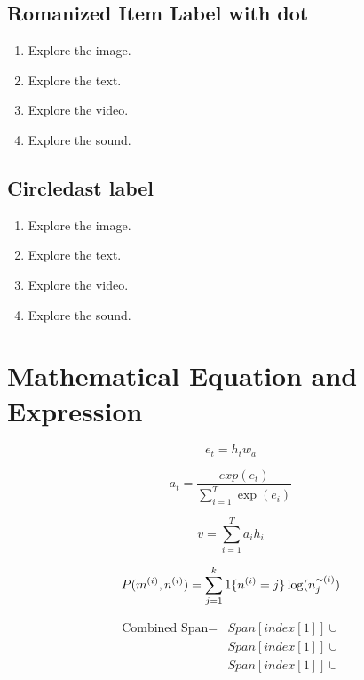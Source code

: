 \documentclass[11pt]{article}
\begin{document}
\subsection{Romanized Item Label with dot}
\begin{enumerate}[nosep, label=\Roman*.]
\item Explore the image.
\item Explore the text.
\item Explore the video.
\item Explore the sound.
\end{enumerate}

\subsection{Circledast label}
\begin{enumerate}[label=$\circledast$]
\item Explore the image.
\item Explore the text.
\item Explore the video.
\item Explore the sound.
\end{enumerate}

\section{Mathematical Equation and Expression}
\label{ref:equation}
\begin{equation}
e_{t} = h_{t}w_{a}
\label{eqn:sampleEqn} %
\end{equation}

\begin{equation*} %
a_{t} = \frac{exp(e_{t})}{\sum^T_{i=1}\exp(e_{i})}
\end{equation*}

\begin{equation*}
v = \sum^T_{i=1} a_{i} h_{i}
\end{equation*}

\begin{equation*}
P(m^{(i)},n^{(i)}) = \sum^k_{j=1} 1\{n^{(i)}=j\} \log(n_j^{\thicksim(i)}) %
\end{equation*}

\begin{equation*}
\begin{split}
\mbox{Combined Span} = &Span[index[1]] \cup \\ %
                       &Span[index[1]] \cup \\
                       &Span[index[1]] \cup
\end{split}
\end{equation*}
\end{document}
